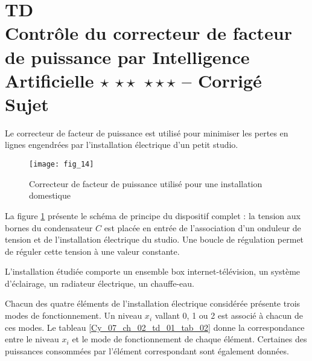 \chapter*{TD  \\ 
Contrôle du correcteur de facteur de puissance par Intelligence Artificielle \ifnormal $\star$ \else \fi \ifdifficile $\star\star$ \else \fi \iftdifficile $\star\star\star$ \else \fi -- \ifprof Corrigé \else Sujet \fi}

\iflivret {} \else
\ifprof  {} \else \fi
\fi

\setcounter{question}{0}

Le correcteur de facteur de puissance est utilisé pour minimiser les pertes en lignes engendrées par l'installation électrique d'un petit studio. 

\begin{figure}[!h]
\centering
\texttt{[image: fig\_14]}
\caption{ Correcteur de facteur de puissance utilisé pour une installation domestique\label{Cy_07_ch_02_td_01_fig_14}}
\end{figure}
La figure \ref{Cy_07_ch_02_td_01_fig_14} présente le schéma de principe du dispositif complet : la tension aux bornes du condensateur $C$ est placée en entrée de l'association d'un onduleur de tension et de l'installation électrique du studio. Une boucle de régulation permet de réguler cette tension à une valeur constante. 

L'installation étudiée comporte un ensemble box internet-télévision, un système d'éclairage, un radiateur électrique, un chauffe-eau.

Chacun des quatre éléments de l'installation électrique considérée présente trois modes de fonctionnement. Un niveau $x_i$ vallant 0, 1 ou 2 est associé à chacun de ces modes. Le tableau \ref{Cy_07_ch_02_td_01_tab_02} donne la correspondance entre le niveau $x_i$ et le mode de fonctionnement de chaque élément. Certaines des puissances consommées par l'élément correspondant sont également données.


